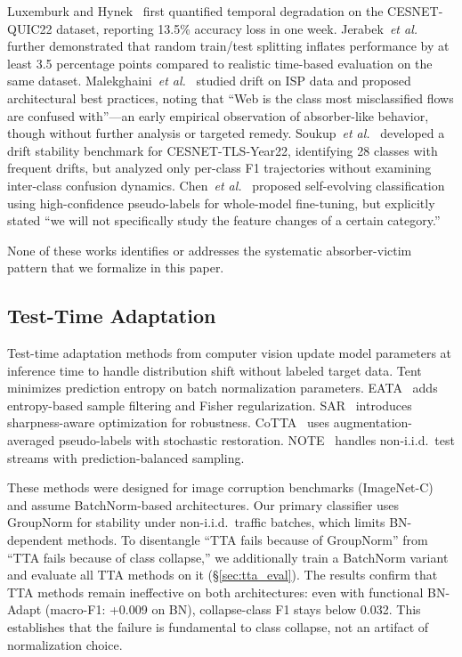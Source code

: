 \documentclass[journal]{IEEEtran}
\makeatletter
\newcommand{\etal}{\textit{et al.}\@}
\makeatother
\begin{document}
Luxemburk and Hynek~\cite{luxemburk2023quic} first quantified temporal degradation on the CESNET-QUIC22 dataset, reporting 13.5\% accuracy loss in one week.
Jerabek~\etal{}~\cite{jerabek2025eval} further demonstrated that random train/test splitting inflates performance by at least 3.5 percentage points compared to realistic time-based evaluation on the same dataset.
Malekghaini~\etal{}~\cite{malekghaini2023drift} studied drift on ISP data and proposed architectural best practices, noting that ``Web is the class most misclassified flows are confused with''---an early empirical observation of absorber-like behavior, though without further analysis or targeted remedy.
Soukup~\etal{}~\cite{soukup2025drift} developed a drift stability benchmark for CESNET-TLS-Year22, identifying 28 classes with frequent drifts, but analyzed only per-class F1 trajectories without examining inter-class confusion dynamics.
Chen~\etal{}~\cite{chen2025selfevolving} proposed self-evolving classification using high-confidence pseudo-labels for whole-model fine-tuning, but explicitly stated ``we will not specifically study the feature changes of a certain category.''

None of these works identifies or addresses the systematic absorber-victim pattern that we formalize in this paper.

\subsection{Test-Time Adaptation}

Test-time adaptation methods from computer vision update model parameters at inference time to handle distribution shift without labeled target data.
Tent~\cite{wang2021tent} minimizes prediction entropy on batch normalization parameters.
EATA~\cite{niu2022eata} adds entropy-based sample filtering and Fisher regularization.
SAR~\cite{niu2023sar} introduces sharpness-aware optimization for robustness.
CoTTA~\cite{wang2022cotta} uses augmentation-averaged pseudo-labels with stochastic restoration.
NOTE~\cite{gong2022note} handles non-i.i.d.\ test streams with prediction-balanced sampling.

These methods were designed for image corruption benchmarks (ImageNet-C) and assume BatchNorm-based architectures.
Our primary classifier uses GroupNorm for stability under non-i.i.d.\ traffic batches, which limits BN-dependent methods.
To disentangle ``TTA fails because of GroupNorm'' from ``TTA fails because of class collapse,'' we additionally train a BatchNorm variant and evaluate all TTA methods on it (\S\ref{sec:tta_eval}).
The results confirm that TTA methods remain ineffective on both architectures: even with functional BN-Adapt (macro-F1: +0.009 on BN), collapse-class F1 stays below 0.032.
This establishes that the failure is fundamental to class collapse, not an artifact of normalization choice.
\end{document}
